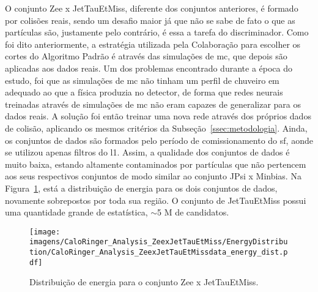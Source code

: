 O conjunto Zee x JetTauEtMiss, diferente dos conjuntos anteriores, é formado por
colisões reais, sendo um desafio maior já que não se sabe de fato o que as
partículas são, justamente pelo contrário, é essa a tarefa do discriminador.
Como foi dito anteriormente, a estratégia utilizada pela Colaboração para
escolher os cortes do Algoritmo Padrão é através das simulações de \gls{mc}, que
depois são aplicadas aos dados reais. Um dos problemas encontrado durante a
época do estudo, foi que as simulações de \gls{mc} não tinham um perfil de
chuveiro \gls{em} adequado ao que a física produzia no detector, de forma que
redes neurais treinadas através de simulações de \gls{mc} não eram capazes de
generalizar para os dados reais. A solução foi então treinar uma nova rede
através dos próprios dados de colisão, aplicando os mesmos critérios da
Subseção~\ref{ssec:metodologia}. Ainda, os conjuntos de dados são formados pelo
período de comissionamento do \gls{sf}, aonde se utilizou apenas filtros do
\gls{l1}. Assim, a qualidade dos conjuntos de dados é muito baixa, estando
altamente contaminados por partículas que não pertencem aos seus respectivos
conjuntos de modo similar ao conjunto JPsi x Minbias. Na
Figura~\ref{fig:zeexjet_distenergia}, está a distribuição de energia para os
dois conjuntos de dados, novamente sobrepostos por toda sua região. O conjunto
de JetTauEtMiss possui uma quantidade grande de estatística, $\sim$5 M de
candidatos.

\begin{figure}[ht]
\centering
\texttt{[image: imagens/CaloRinger\_Analysis\_ZeexJetTauEtMiss/EnergyDistribution/CaloRinger\_Analysis\_ZeexJetTauEtMissdata\_energy\_dist.pdf]}
\caption{Distribuição de energia para o conjunto Zee x JetTauEtMiss.}
\label{fig:zeexjet_distenergia}
\end{figure}

